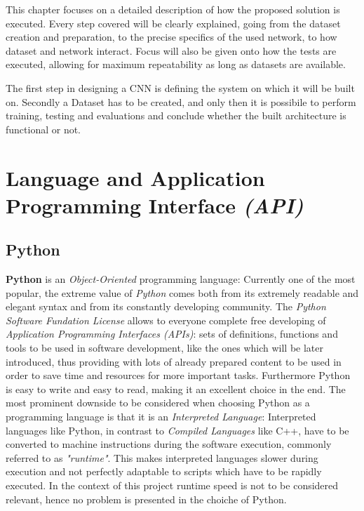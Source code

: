 \documentclass[../main.tex]{subfiles}
\begin{document}
\label{capitolo3}
\thispagestyle{empty}

This chapter focuses on a detailed description of how the proposed solution is executed. Every step covered will be clearly explained, going from the dataset creation and preparation, to the precise specifics of the used network, to how dataset and network interact. Focus will also be given onto how the tests are executed, allowing for maximum repeatability as long as datasets are available.

The first step in designing a CNN is defining the system on which it will be built on. Secondly a Dataset has to be created, and only then it is possibile to perform training, testing and evaluations and conclude whether the built architecture is functional or not. 

\section{Language and Application Programming Interface \textit{(API)}}
\subsection{Python}
\textbf{Python} is an \textit{Object-Oriented} programming language: Currently one of the most popular, the extreme value of \textit{Python} comes both from its extremely readable and elegant syntax and from its constantly developing community. The \textit{Python Software Fundation License}\cite{pythonlicense}	allows to everyone complete free developing of \textit{Application Programming Interfaces (APIs)}: sets of definitions, functions and tools to be used in software development, like the ones which will be later introduced, thus providing with lots of already prepared content to be used in order to save time and resources for more important tasks. Furthermore Python is easy to write and easy to read, making it an excellent choice in the end. The most prominent downside to be considered when choosing Python as a programming language is that it is an \textit{Interpreted Language}: Interpreted languages like Python, in contrast to \textit{Compiled Languages} like C++, have to be converted to machine instructions during the software execution, commonly referred to as \textit{"runtime"}. This makes interpreted languages slower during execution and not perfectly adaptable to scripts which have to be rapidly executed. In the context of this project runtime speed is not to be considered relevant, hence no problem is presented in the choiche of Python.
\vspace{5mm}
\end{document}
